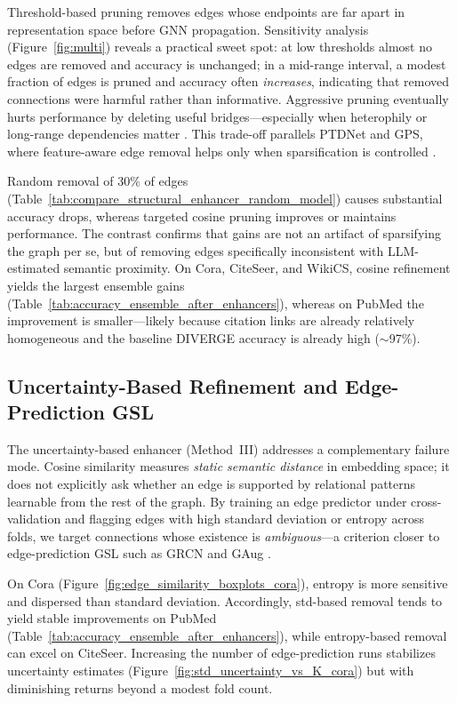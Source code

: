 \documentclass{article}
\begin{document}
Threshold-based pruning removes edges whose endpoints are far apart in representation
space before GNN propagation. Sensitivity analysis (Figure~\ref{fig:multi}) reveals a
practical sweet spot: at low thresholds almost no edges are removed and accuracy is
unchanged; in a mid-range interval, a modest fraction of edges is pruned and accuracy
often \emph{increases}, indicating that removed connections were harmful rather than
informative. Aggressive pruning eventually hurts performance by deleting useful
bridges---especially when heterophily or long-range dependencies matter
\citep{dong2023gps}. This trade-off parallels PTDNet and GPS, where feature-aware edge
removal helps only when sparsification is controlled \citep{luo2021ptdnet,dong2023gps}.

Random removal of 30\% of edges
(Table~\ref{tab:compare_structural_enhancer_random_model}) causes substantial accuracy
drops, whereas targeted cosine pruning improves or maintains performance. The contrast
confirms that gains are not an artifact of sparsifying the graph per se, but of removing
edges specifically inconsistent with LLM-estimated semantic proximity. On Cora, CiteSeer,
and WikiCS, cosine refinement yields the largest ensemble gains
(Table~\ref{tab:accuracy_ensemble_after_enhancers}), whereas on PubMed the improvement
is smaller---likely because citation links are already relatively homogeneous and the
baseline DIVERGE accuracy is already high ($\sim$97\%).


\subsection{Uncertainty-Based Refinement and Edge-Prediction GSL}
\label{sec:disc-uncertainty}

The uncertainty-based enhancer (Method~III) addresses a complementary failure mode.
Cosine similarity measures \emph{static semantic distance} in embedding space; it does
not explicitly ask whether an edge is supported by relational patterns learnable from
the rest of the graph. By training an edge predictor under cross-validation and flagging
edges with high standard deviation or entropy across folds, we target connections whose
existence is \emph{ambiguous}---a criterion closer to edge-prediction GSL such as GRCN
and GAug \citep{yu2020grcn,zhao2021gaug}.

On Cora (Figure~\ref{fig:edge_similarity_boxplots_cora}), entropy is more sensitive and
dispersed than standard deviation. Accordingly, std-based removal tends to yield stable
improvements on PubMed (Table~\ref{tab:accuracy_ensemble_after_enhancers}), while
entropy-based removal can excel on CiteSeer. Increasing the number of edge-prediction
runs stabilizes uncertainty estimates (Figure~\ref{fig:std_uncertainty_vs_K_cora}) but
with diminishing returns beyond a modest fold count.
\end{document}
